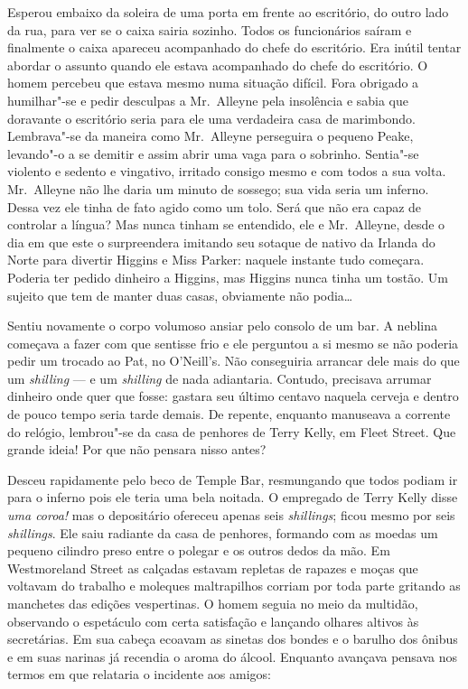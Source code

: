 \noindent\dotfill

\smallskip

Esperou embaixo da soleira de uma porta em frente ao escritório, do outro lado
da rua, para ver se o caixa sairia sozinho.  Todos os funcionários saíram e
finalmente o caixa apareceu acompanhado do chefe do escritório.  Era inútil
tentar abordar o assunto quando ele estava acompanhado do chefe do escritório.
O homem percebeu que estava mesmo numa situação difícil.  Fora obrigado a
humilhar"-se e pedir desculpas a Mr.~Alleyne pela insolência e sabia que
doravante o escritório seria para ele uma verdadeira casa de marimbondo.
Lembrava"-se da maneira como Mr.~Alleyne perseguira o pequeno Peake, levando"-o a
se demitir e assim abrir uma vaga para o sobrinho.  Sentia"-se violento e
sedento e vingativo, irritado consigo mesmo e com todos a sua volta.  
Mr.~Alleyne não lhe daria um minuto de sossego; sua vida seria um inferno.  Dessa
vez ele tinha de fato agido como um tolo.  Será que não era capaz de controlar
a língua?  Mas nunca tinham se entendido, ele e Mr.~Alleyne, desde o dia em que
este o surpreendera imitando seu sotaque de nativo da Irlanda do Norte para
divertir Higgins e Miss Parker: naquele instante tudo começara.  Poderia ter
pedido dinheiro a Higgins, mas Higgins nunca tinha um tostão.  Um sujeito que
tem de manter duas casas, obviamente não podia\ldots{}

Sentiu novamente o corpo volumoso ansiar pelo consolo de um bar.  A neblina
começava a fazer com que sentisse frio e ele perguntou a si mesmo se não
poderia pedir um trocado ao Pat, no O’Neill’s.  Não conseguiria arrancar dele
mais do que um \textit{shilling} --- e um \textit{shilling} de nada
adiantaria.  Contudo, precisava arrumar dinheiro onde quer que fosse: gastara
seu último centavo naquela cerveja e dentro de pouco tempo seria tarde demais.
De repente, enquanto manuseava a corrente do relógio, lembrou"-se da casa de
penhores de Terry Kelly, em Fleet Street.  Que grande ideia!  Por que não
pensara nisso antes?

Desceu rapidamente pelo beco de Temple Bar, resmungando que todos podiam ir
para o inferno pois ele teria uma bela noitada.  O empregado de Terry Kelly
disse \textit{uma coroa!} mas o depositário ofereceu apenas seis
\textit{shillings}; ficou mesmo por seis \textit{shillings}.  Ele saiu radiante
da casa de penhores, formando com as moedas um pequeno cilindro preso entre o
polegar e os outros dedos da mão.  Em Westmoreland Street as calçadas estavam
repletas de rapazes e moças que voltavam do trabalho e moleques maltrapilhos
corriam por toda parte gritando as manchetes das edições vespertinas.  O homem
seguia no meio da multidão, observando o espetáculo com certa satisfação e
lançando olhares altivos às secretárias.  Em sua cabeça ecoavam as sinetas dos
bondes e o barulho dos ônibus e em suas narinas já recendia o aroma do álcool.
Enquanto avançava pensava nos termos em que relataria o incidente aos amigos:

